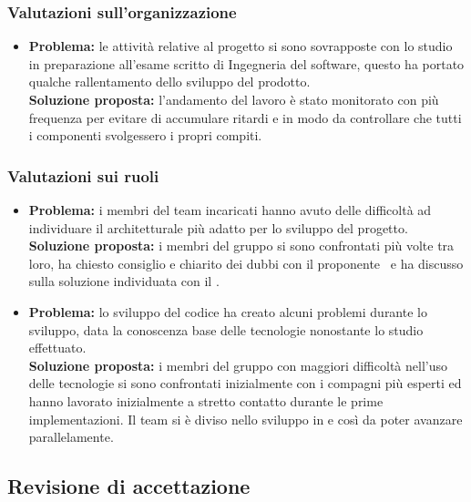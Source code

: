 \subsubsection{Valutazioni sull'organizzazione}
\begin{itemize}
	\item \textbf{Problema:} le attività relative al progetto si sono sovrapposte con lo studio in preparazione all'esame scritto di Ingegneria del software, questo ha portato qualche rallentamento dello sviluppo del prodotto.\\
	\textbf{Soluzione proposta:} l'andamento del lavoro è stato monitorato con più frequenza per evitare di accumulare ritardi e in modo da controllare che tutti i componenti svolgessero i propri compiti.
\end{itemize}
\subsubsection{Valutazioni sui ruoli}
\begin{itemize}
	\item \textbf{Problema:} i membri del team incaricati hanno avuto delle difficoltà ad individuare il  architetturale più adatto per lo sviluppo del progetto.\\
	\textbf{Soluzione proposta:} i membri del gruppo si sono confrontati più volte tra loro, ha chiesto consiglio e chiarito dei dubbi con il proponente \Proponente\ e ha discusso sulla soluzione individuata con il \CR{}.
\end{itemize}
\begin{itemize}
	\item \textbf{Problema:} lo sviluppo del codice ha creato alcuni problemi durante lo sviluppo, data la conoscenza base delle tecnologie nonostante lo studio effettuato.\\
	\textbf{Soluzione proposta:} i membri del gruppo con maggiori difficoltà nell'uso delle tecnologie si sono confrontati inizialmente con i compagni più esperti ed hanno lavorato inizialmente a stretto contatto durante le prime implementazioni. Il team si è diviso nello sviluppo in  e  così da poter avanzare parallelamente.
\end{itemize}
\subsection{Revisione di accettazione} \label{MiglioramentoRA}
